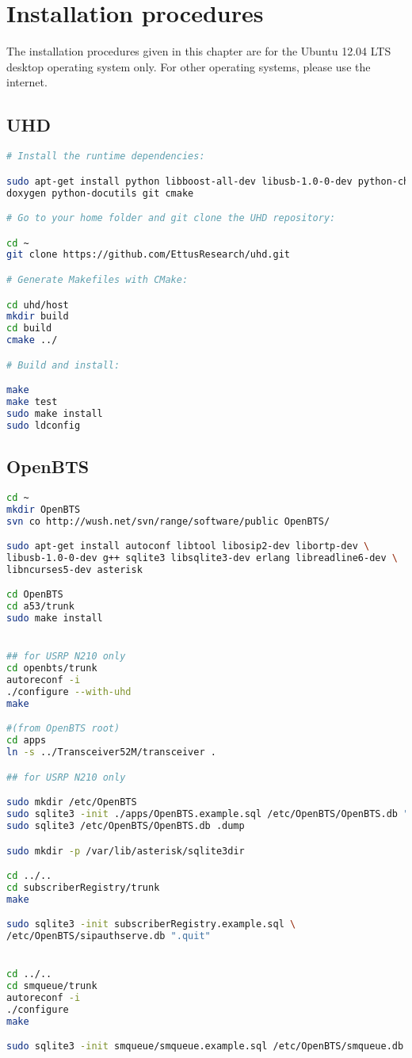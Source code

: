 \chapter{Installation procedures}
The installation procedures given in this chapter are for the Ubuntu 12.04 LTS
desktop operating system only. For other operating systems, please use the 
internet.
\section{UHD}
\begin{lstlisting}[language=bash]
# Install the runtime dependencies:

sudo apt-get install python libboost-all-dev libusb-1.0-0-dev python-cheetah \
doxygen python-docutils git cmake

# Go to your home folder and git clone the UHD repository:

cd ~
git clone https://github.com/EttusResearch/uhd.git

# Generate Makefiles with CMake:

cd uhd/host
mkdir build
cd build
cmake ../

# Build and install:

make
make test
sudo make install
sudo ldconfig
\end{lstlisting}


\section{OpenBTS}

\begin{lstlisting}[language=bash]
cd ~
mkdir OpenBTS
svn co http://wush.net/svn/range/software/public OpenBTS/

sudo apt-get install autoconf libtool libosip2-dev libortp-dev \
libusb-1.0-0-dev g++ sqlite3 libsqlite3-dev erlang libreadline6-dev \
libncurses5-dev asterisk

cd OpenBTS
cd a53/trunk
sudo make install


## for USRP N210 only
cd openbts/trunk
autoreconf -i
./configure --with-uhd
make

#(from OpenBTS root)
cd apps
ln -s ../Transceiver52M/transceiver .

## for USRP N210 only

sudo mkdir /etc/OpenBTS
sudo sqlite3 -init ./apps/OpenBTS.example.sql /etc/OpenBTS/OpenBTS.db ".quit"
sudo sqlite3 /etc/OpenBTS/OpenBTS.db .dump

sudo mkdir -p /var/lib/asterisk/sqlite3dir

cd ../..
cd subscriberRegistry/trunk
make

sudo sqlite3 -init subscriberRegistry.example.sql \
/etc/OpenBTS/sipauthserve.db ".quit"


cd ../..
cd smqueue/trunk
autoreconf -i
./configure
make

sudo sqlite3 -init smqueue/smqueue.example.sql /etc/OpenBTS/smqueue.db ".quit"

\end{lstlisting}






